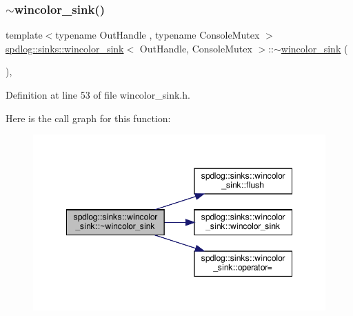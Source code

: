 \subsubsection{\texorpdfstring{$\sim$wincolor\+\_\+sink()}{~wincolor\_sink()}}
{\footnotesize\ttfamily template$<$typename Out\+Handle , typename Console\+Mutex $>$ \\
\hyperlink{classspdlog_1_1sinks_1_1wincolor__sink}{spdlog\+::sinks\+::wincolor\+\_\+sink}$<$ Out\+Handle, Console\+Mutex $>$\+::$\sim$\hyperlink{classspdlog_1_1sinks_1_1wincolor__sink}{wincolor\+\_\+sink} (\begin{DoxyParamCaption}{ }\end{DoxyParamCaption})\hspace{0.3cm}{\ttfamily [inline]}, {\ttfamily [override]}}



Definition at line 53 of file wincolor\+\_\+sink.\+h.

Here is the call graph for this function\+:
\nopagebreak
\begin{figure}[H]
\begin{center}
\leavevmode
\includegraphics[width=348pt]{classspdlog_1_1sinks_1_1wincolor__sink_a229d666b7880d587aefa8c5d999acfb4_cgraph}
\end{center}
\end{figure}
\mbox{\label{classspdlog_1_1sinks_1_1wincolor__sink_a89e2ddbd1297c8c722d63277b458b5c1}} 
